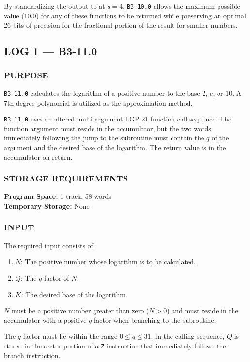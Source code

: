 By standardizing the output to at $q=4$, \texttt{B3-10.0} allows the maximum possible value (10.0) for any of these functions to be returned while preserving an optimal 26 bits of precision for the fractional portion of the result for smaller numbers.

\newpage
\subsection*{LOG 1 --- B3-11.0}
\label{sec:logarithm_function}

\subsubsection*{PURPOSE}
\texttt{B3-11.0} calculates the logarithm of a positive number to the base 2, $e$, or 10. A 7th-degree polynomial is utilized as the approximation method.

\texttt{B3-11.0} uses an altered multi-argument LGP-21 function call sequence. The function argument must reside in the accumulator, but the two words immediately following the jump to the subroutine must contain the $q$ of the argument and the desired base of the logarithm. The return value
is in the accumulator on return.

\subsubsection*{STORAGE REQUIREMENTS}
\textbf{Program Space:} 1 track, 58 words \\
\textbf{Temporary Storage:} None

\subsubsection*{INPUT}
The required input consists of:
\begin{enumerate}
    \item $N$: The positive number whose logarithm is to be calculated.
    \item $Q$: The $q$ factor of $N$.
    \item $K$: The desired base of the logarithm.
\end{enumerate}

$N$ must be a positive number greater than zero ($N > 0$) and must reside in the accumulator with a positive $q$ factor when branching to the subroutine.

The $q$ factor must lie within the range $0 \le q \le 31$. In the calling sequence, $Q$ is stored in the sector portion of a \texttt{Z} instruction that immediately follows the branch instruction.

